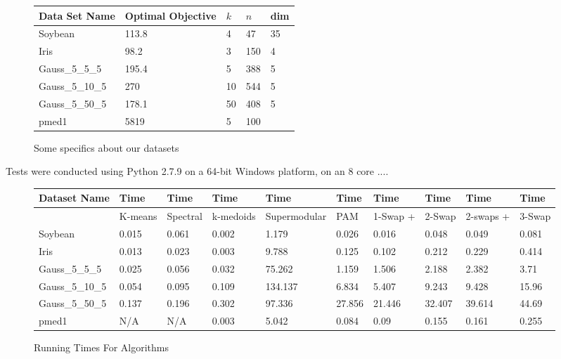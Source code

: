 \documentclass{article}
\begin{document}
\begin{figure}[h]
\begin{tabular}{ | l | l | l | l | l | }
\hline
	Data Set Name &Optimal Objective & $k$ & $n$ & dim   \\ \hline
	Soybean & 113.8 & 4 & 47 & 35 \\ 
	Iris & 98.2 & 3 & 150 & 4 \\ 
	Gauss\_5\_5\_5 & 195.4 & 5 & 388 & 5 \\ 
	Gauss\_5\_10\_5 & 270 & 10 & 544 & 5 \\ 
	Gauss\_5\_50\_5 & 178.1 & 50 & 408 & 5 \\ 
	pmed1 & 5819 & 5 & 100 & \  \\ 
	\hline
\end{tabular}
\caption{Some specifics about our datasets}
\end{figure}

Tests were conducted using Python 2.7.9 on a 64-bit Windows platform, on an 8 core ....

\begin{figure*}[h]
\begin{tabular}{ | l | l | l | l | l | l | l | l | l | l | }
\hline
	Dataset Name & Time & Time & Time & Time & Time & Time & Time & Time & Time \\ \hline
	&K-means & Spectral & k-medoids & Supermodular & PAM & 1-Swap + & 2-Swap & 2-swaps + & 3-Swap  \\ \hline
	Soybean & 0.015 & 0.061 & 0.002 & 1.179 & 0.026 & 0.016 & 0.048 & 0.049 & 0.081 \\ 
	Iris & 0.013 & 0.023 & 0.003 & 9.788 & 0.125 & 0.102 & 0.212 & 0.229 & 0.414 \\ 
	Gauss\_5\_5\_5 & 0.025 & 0.056 & 0.032 & 75.262 & 1.159 & 1.506 & 2.188 & 2.382 & 3.71 \\ 
	Gauss\_5\_10\_5 & 0.054 & 0.095 & 0.109 & 134.137 & 6.834 & 5.407 & 9.243 & 9.428 & 15.96 \\ 
	Gauss\_5\_50\_5 & 0.137 & 0.196 & 0.302 & 97.336 & 27.856 & 21.446 & 32.407 & 39.614 & 44.69 \\ 
	pmed1 & N/A & N/A & 0.003 & 5.042 & 0.084 & 0.09 & 0.155 & 0.161 & 0.255 \\ \hline
\end{tabular}

\caption{Running Times For Algorithms}
\end{figure*}
\end{document}
